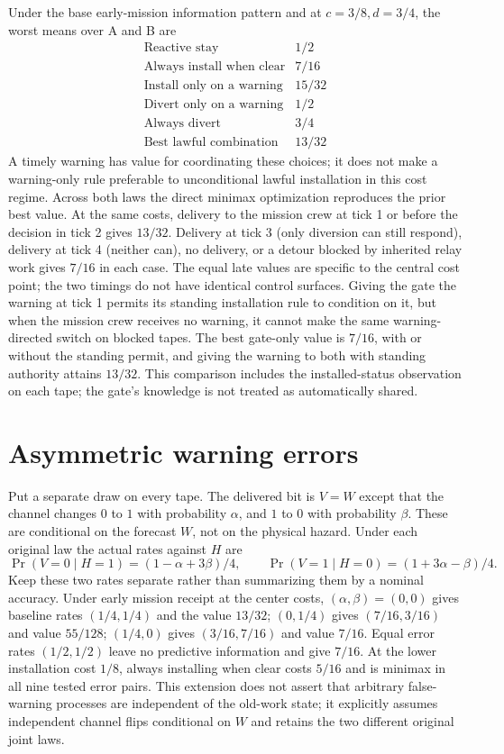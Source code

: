 \documentclass[11pt]{article}
\begin{document}
Under the base early-mission information pattern and at $c=3/8,d=3/4$,
the worst means over A and B are
\[
\begin{array}{l|r}
\text{Reactive stay}&1/2\\
\text{Always install when clear}&7/16\\
\text{Install only on a warning}&15/32\\
\text{Divert only on a warning}&1/2\\
\text{Always divert}&3/4\\
\text{Best lawful combination}&13/32
\end{array}
\]
A timely warning has value for coordinating these choices; it does not
make a warning-only rule preferable to unconditional lawful installation
in this cost regime. Across both laws the direct minimax optimization
reproduces the prior best value. At the same costs, delivery to the mission
crew at tick 1 or before the decision in tick 2 gives $13/32$. Delivery
at tick 3 (only diversion can still respond), delivery at tick 4 (neither
can), no delivery, or a detour blocked by inherited relay work gives
$7/16$ in each case. The equal late values are specific to the central cost
point; the two timings do not have identical control surfaces.
Giving the gate the warning at tick 1 permits its standing installation
rule to condition on it, but when the mission crew receives no warning,
it cannot make the same warning-directed switch on blocked tapes.
The best gate-only value is $7/16$, with or without the standing permit,
and giving the warning to both with standing authority attains $13/32$.
This comparison includes the installed-status observation on each tape;
the gate's knowledge is not treated as automatically shared.

\section{Asymmetric warning errors}
Put a separate draw on every tape. The delivered bit is $V=W$ except
that the channel changes $0$ to $1$ with probability $\alpha$, and
$1$ to $0$ with probability $\beta$. These are conditional on the
forecast $W$, not on the physical hazard. Under each original law
the actual rates against $H$ are
\[
   \Pr(V=0\mid H=1)=(1-\alpha+3\beta)/4,\qquad
   \Pr(V=1\mid H=0)=(1+3\alpha-\beta)/4.
\]
Keep these two rates separate rather than summarizing them by a
nominal accuracy. Under early mission receipt at the center costs,
$(\alpha,\beta)=(0,0)$ gives baseline rates $(1/4,1/4)$ and the
value $13/32$; $(0,1/4)$ gives $(7/16,3/16)$ and value $55/128$;
$(1/4,0)$ gives $(3/16,7/16)$ and value $7/16$. Equal error rates
$(1/2,1/2)$ leave no predictive information and give $7/16$.
At the lower installation cost $1/8$, always installing when clear
costs $5/16$ and is minimax in all nine tested error pairs. This extension
does not assert that arbitrary false-warning processes are independent
of the old-work state; it explicitly assumes independent channel flips
conditional on $W$ and retains the two different original joint laws.
\end{document}
